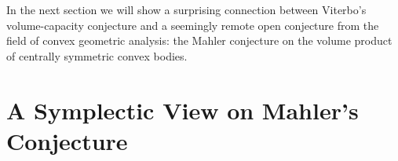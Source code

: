 \documentclass{icmart}
\theoremstyle{definition}
\begin{document}
%
\smallskip

%
%
%

%
%
%
%
%



In the next section we will show a surprising connection between Viterbo's volume-capacity conjecture and a seemingly remote open conjecture from the field of convex geometric analysis: 
the Mahler conjecture on the volume product of centrally symmetric convex bodies.


\section{ A Symplectic View on Mahler's Conjecture} \label{SEC:MAHLER}
\end{document}
